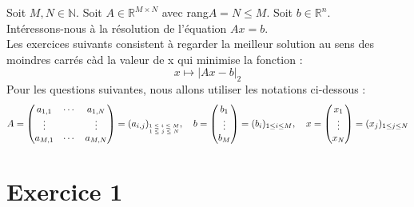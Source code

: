 \documentclass[a4paper, 10pt]{article}
\newcommand{\IR}{\mathbb{R}}
\newcommand{\IN}{\mathbb{N}}
\begin{document}
\renewcommand{\contentsname}{Table des matières}
\tableofcontents

\newpage

\noindent
Soit \( M, N \in \IN \). Soit \( A \in \IR^{M \times N} \) avec rang\( A = N \leq M \). Soit \( b \in \mathbb{R}^n \). \\
Intéressons-nous à la résolution de l'équation \( Ax = b \). \\
Les exercices suivants consistent à regarder la meilleur solution au sens des moindres carrés càd la valeur de x qui minimise la fonction :
\begin{equation}
    \label{eq:1}
    x \mapsto |Ax - b|_2
\end{equation}
Pour les questions suivantes, nous allons utiliser les notations ci-dessous :
$$
A =
\begin{pmatrix}
a_{1, 1} & \cdots & a_{1, N} \\
\vdots   &        & \vdots \\
a_{M, 1} & \cdots & a_{M, N}
\end{pmatrix}
= (a_{i, j})_{
\tiny \begin{matrix}
1 \leq i \leq M \\
1 \leq j \leq N
\end{matrix}}
, \quad b =
\begin{pmatrix}
b_1 \\
\vdots \\
b_M
\end{pmatrix}
= (b_i)_{1 \leq i \leq M}, \quad x =
\begin{pmatrix} x_1 \\
\vdots \\
x_N
\end{pmatrix}
= (x_j)_{1 \leq j \leq N}
$$

\section{Exercice 1}
\end{document}
